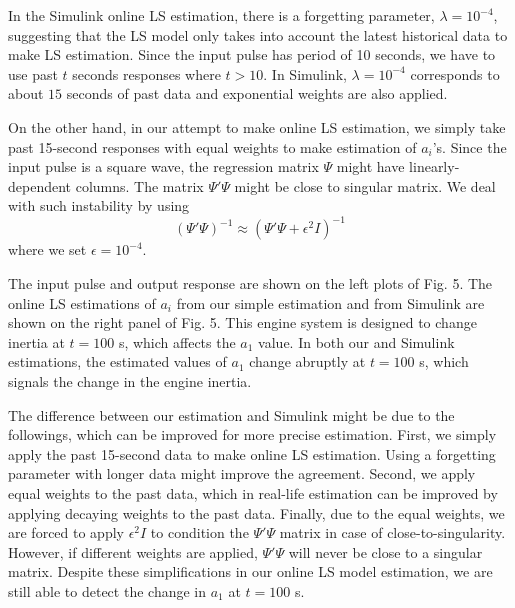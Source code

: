 \documentclass[a4paper, 11pt]{article}
\begin{document}
In the Simulink online LS estimation, there is a forgetting parameter, $\lambda=10^{-4}$, suggesting that the LS model only takes into account the latest historical data to make LS estimation. Since the input pulse has period of 10 seconds, we have to use past $t$ seconds responses where $t > 10$. In Simulink, $\lambda=10^{-4}$ corresponds to about $15$ seconds of past data and exponential weights are also applied. 

On the other hand, in our attempt to make online LS estimation, we simply take past 15-second responses with equal weights to make estimation of $a_i$'s. Since the input pulse is a square wave, the regression matrix $\Psi$ might have linearly-dependent columns. The matrix $\Psi'\Psi$ might be close to singular matrix. We deal with such instability by using 
\begin{equation}
(\Psi'\Psi)^{-1} \approx (\Psi'\Psi + \epsilon^2 I)^{-1}
\end{equation}
where we set $\epsilon = 10^{-4}$. 

The input pulse and output response are shown on the left plots of Fig. 5. The online LS estimations of $a_i$ from our simple estimation and from Simulink are shown on the right panel of Fig. 5. This engine system is designed to change inertia at $t=100$ s, which affects the $a_1$ value. In both our and Simulink estimations, the estimated values of $a_1$ change abruptly at $t=100$ s, which signals the change in the engine inertia. 

The difference between our estimation and Simulink might be due to the followings, which can be improved for more precise estimation. First, we simply apply the past 15-second data to make online LS estimation. Using a forgetting parameter with longer data might improve the agreement. Second, we apply equal weights to the past data, which in real-life estimation can be improved by applying decaying weights to the past data. Finally, due to the equal weights, we are forced to apply $\epsilon^2 I$ to condition the $\Psi' \Psi$ matrix in case of close-to-singularity. However, if different weights are applied, $\Psi' \Psi$ will never be close to a singular matrix. Despite these simplifications in our online LS model estimation, we are still able to detect the change in $a_1$ at $t=100$ s. 
\end{document}
